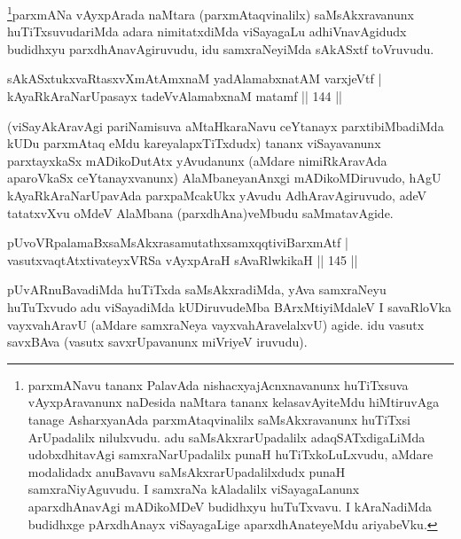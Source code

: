 \begin{artha}
\footnote[2]{parxmANavu tananx PalavAda nishacxyajAcnxnavanunx huTiTxsuva vAyxpAravanunx naDesida naMtara tananx kelasavAyiteMdu hiMtiruvAga tanage AsharxyanAda parxmAtaqvinalilx saMsAkxravanunx huTiTxsi ArUpadalilx nilulxvudu. adu saMsAkxrarUpadalilx adaqSATxdigaLiMda udobxdhitavAgi samxraNarUpadalilx punaH huTiTxkoLuLxvudu, aMdare modalidadx anuBavavu saMsAkxrarUpadalilxdudx punaH samxraNiyAguvudu. I samxraNa kAladalilx viSayagaLanunx aparxdhAnavAgi mADikoMDeV budidhxyu huTuTxvavu. I kAraNadiMda budidhxge pArxdhAnayx viSayagaLige aparxdhAnateyeMdu ariyabeVku.}parxmANa vAyxpArada naMtara (parxmAtaqvinalilx) saMsAkxravanunx huTiTxsuvudariMda adara nimitatxdiMda viSayagaLu adhiVnavAgidudx budidhxyu parxdhAnavAgiruvudu, idu samxraNeyiMda sAkASxtf toVruvudu.
\end{artha}


\begin{shl}
sAkASxtukxvaRtasxvXmAtAmxnaM yadAlamabxnatAM varxjeVtf |\\
kAyaRkAraNarUpasayx tadeVvA\s \s lamabxnaM matamf \hfill || 144 ||
\end{shl}

\begin{artha}
(viSayAkAravAgi pariNamisuva aMtaHkaraNavu ceYtanayx parxtibiMbadiMda kUDu parxmAtaq eMdu kareyalapxTiTxdudx) tananx viSayavanunx parxtayxkaSx mADikoDutAtx yAvudanunx (aMdare nimiRkAravAda aparoVkaSx ceYtanayxvanunx) AlaMbaneyanAnxgi mADikoMDiruvudo, hAgU kAyaRkAraNarUpavAda parxpaMcakUkx yAvudu AdhAravAgiruvudo, adeV tatatxvXvu oMdeV AlaMbana (parxdhAna)veMbudu saMmatavAgide.
\end{artha}


\begin{shl}
pUvoVRpalamaBxsaMsAkxrasamutathxsamxqqtiviBarxmAtf |\\
vasutxvaqtAtxtivateyxVRSa vAyxpAraH sAvaRlwkikaH \hfill || 145 ||
\end{shl}

\begin{artha}
pUvARnuBavadiMda huTiTxda saMsAkxradiMda, yAva samxraNeyu huTuTxvudo adu viSayadiMda kUDiruvudeMba BArxMtiyiMdaleV I savaRloVka vayxvahAravU (aMdare samxraNeya vayxvahAravelalxvU) agide. idu vasutx savxBAva (vasutx savxrUpavanunx miVriyeV iruvudu).
\end{artha}

